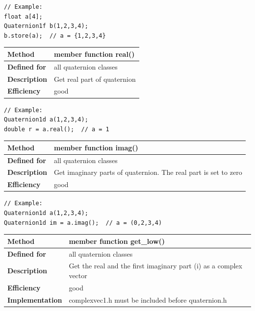 \documentclass[11pt,a4paper,oneside,openright]{report}
\newcommand{\vspacesmall}{\vspace{3mm}}
\newcommand{\vspacebig}{\vspace{6mm}}
\begin{document}
\begin{lstlisting}[frame=none]
// Example:
float a[4];
Quaternion1f b(1,2,3,4);
b.store(a);  // a = {1,2,3,4}
\end{lstlisting}
\vspacebig


\begin{tabular}{|p{25mm}|p{100mm}|}
\hline
\bfseries Method & member function real() \\ \hline
\bfseries Defined for & all quaternion classes \\ \hline
\bfseries Description & Get real part of quaternion \\ \hline
\bfseries Efficiency & good \\ \hline
\end{tabular}
\vspacesmall

\begin{lstlisting}[frame=none]
// Example:
Quaternion1d a(1,2,3,4);
double r = a.real();  // a = 1
\end{lstlisting}
\vspacebig


\begin{tabular}{|p{25mm}|p{100mm}|}
\hline
\bfseries Method & member function imag() \\ \hline
\bfseries Defined for & all quaternion classes \\ \hline
\bfseries Description & Get imaginary parts of quaternion. The real part is set to zero \\ \hline
\bfseries Efficiency & good \\ \hline
\end{tabular}
\vspacesmall

\begin{lstlisting}[frame=none]
// Example:
Quaternion1d a(1,2,3,4);
Quaternion1d im = a.imag();  // a = (0,2,3,4)
\end{lstlisting}
\vspacebig


\begin{tabular}{|p{25mm}|p{100mm}|}
\hline
\bfseries Method & member function get\_low() \\ \hline
\bfseries Defined for & all quaternion classes \\ \hline
\bfseries Description & Get the real and the first imaginary part (i) as a complex vector \\ \hline
\bfseries Efficiency & good \\ \hline
\bfseries Implementation & complexvec1.h must be included before quaternion.h \\ \hline
\end{tabular}
\vspacesmall
\end{document}
